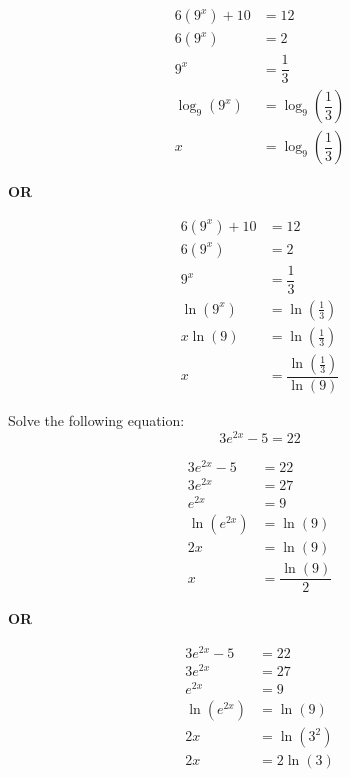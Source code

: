 \documentclass[12pt,letterpaper]{exam}
\begin{document}
\begin{questions}
{	\[
	\begin{aligned}
	6(9^x) + 10&= 12 \\
	6(9^x)&= 2 \\
	9^x&= \dfrac{1}{3} \\
	\log_9(9^x)&= \log_9 \left( \dfrac{1}{3} \right) \\
	x&= \log_9 \left( \dfrac{1}{3} \right)
	\end{aligned}
	\]

\begin{center} {\bfseries OR} \end{center}

	\[
	\begin{aligned}
	6(9^x) + 10&= 12 \\
	6(9^x)&= 2 \\
	9^x&= \dfrac{1}{3} \\
	\ln(9^x)&= \ln\left( \frac{1}{3} \right) \\
	x \ln(9)&= \ln\left( \frac{1}{3} \right) \\
	x&= \dfrac{\ln\left( \frac{1}{3} \right)}{\ln(9)}
	\end{aligned}
	\]
}



\newpage
\question[7] Solve the following equation:
	\[
	3e^{2x} - 5= 22
	\] \pspace
	
{\itshape 
	\[
	\begin{aligned}
	3e^{2x} - 5&= 22 \\[0.3cm]
	3e^{2x}&= 27 \\[0.3cm]
	e^{2x}&= 9 \\[0.3cm]
	\ln(e^{2x})&= \ln(9) \\[0.3cm]
	2x&= \ln(9) \\[0.3cm]
	x&= \dfrac{\ln(9)}{2}
	\end{aligned}
	\]

\begin{center} {\bfseries OR} \end{center}

	\[
	\begin{aligned}
	3e^{2x} - 5&= 22 \\[0.3cm]
	3e^{2x}&= 27 \\[0.3cm]
	e^{2x}&= 9 \\[0.3cm]
	\ln(e^{2x})&= \ln(9) \\[0.3cm]
	2x&= \ln(3^2) \\[0.3cm]
	2x&= 2\ln(3) \\[0.3cm]
	\end{aligned}
	\]
	
}
\end{questions}
\end{document}
